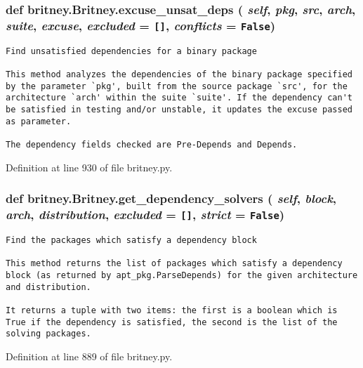 \subsubsection{\setlength{\rightskip}{0pt plus 5cm}def britney.Britney.excuse\_\-unsat\_\-deps ( {\em self},  {\em pkg},  {\em src},  {\em arch},  {\em suite},  {\em excuse},  {\em excluded} = {\tt []},  {\em conflicts} = {\tt False})}\label{classbritney_1_1Britney_f51c60a69f3a9dc2bc5afdb2ffaf3990}




\footnotesize\begin{verbatim}Find unsatisfied dependencies for a binary package

This method analyzes the dependencies of the binary package specified
by the parameter `pkg', built from the source package `src', for the
architecture `arch' within the suite `suite'. If the dependency can't
be satisfied in testing and/or unstable, it updates the excuse passed
as parameter.

The dependency fields checked are Pre-Depends and Depends.
\end{verbatim}
\normalsize
 

Definition at line 930 of file britney.py.
\subsubsection{\setlength{\rightskip}{0pt plus 5cm}def britney.Britney.get\_\-dependency\_\-solvers ( {\em self},  {\em block},  {\em arch},  {\em distribution},  {\em excluded} = {\tt []},  {\em strict} = {\tt False})}\label{classbritney_1_1Britney_5461f49e3e75a251ebedfd37d2a5ff0c}




\footnotesize\begin{verbatim}Find the packages which satisfy a dependency block

This method returns the list of packages which satisfy a dependency
block (as returned by apt_pkg.ParseDepends) for the given architecture
and distribution.

It returns a tuple with two items: the first is a boolean which is
True if the dependency is satisfied, the second is the list of the
solving packages.
\end{verbatim}
\normalsize
 

Definition at line 889 of file britney.py.
